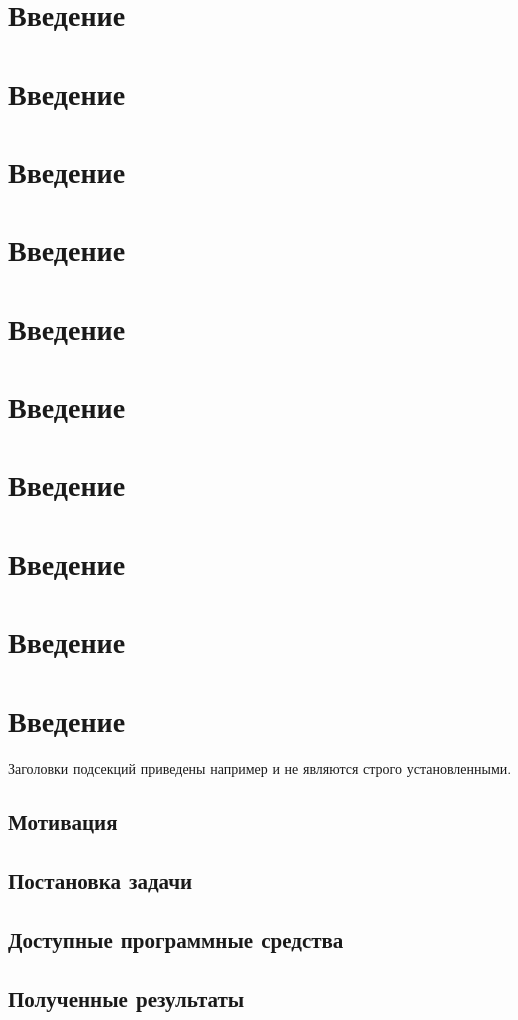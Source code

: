 \documentclass[aps,%
12pt,%
final,%
oneside,
onecolumn,%
musixtex, %
superscriptaddress,%
centertags]{article} %
\begin{document}
\section{Введение}\section{Введение}\section{Введение}\section{Введение}\section{Введение}\section{Введение}\section{Введение}\section{Введение}\section{Введение}\section{Введение}
Заголовки подсекций приведены например и не являются строго установленными.
\subsection{Мотивация}
\subsection{Постановка задачи}
\subsection{Доступные программные средства}
\subsection{Полученные результаты}
\end{document}
